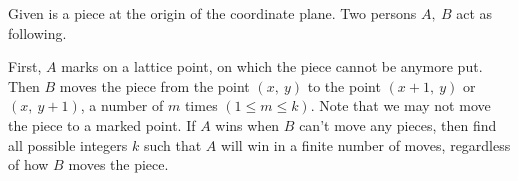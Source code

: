 Given is a piece at the origin of the coordinate plane. Two persons $A,\ B$ act as following.

First, $A$ marks on a lattice point, on which the piece cannot be anymore put. Then $B$ moves the piece from the point $(x,\ y)$ to the point $(x+1,\ y)$ or $(x,\ y+1)$, a number of $m$ times $(1\leq m\leq k)$. Note that we may not move the piece to a marked point. If $A$ wins when $B$ can't move any pieces, then find all possible integers $k$ such that $A$ will win in a finite number of moves, regardless of how $B$ moves the piece.